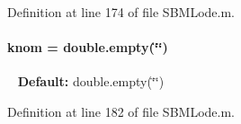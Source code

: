 Definition at line 174 of file S\+B\+M\+Lode.\+m.

\hypertarget{class_s_b_m_lode_a744d356a79732f2b65d02f220c580dd4}{}
\paragraph[{knom}]{\setlength{\rightskip}{0pt plus 5cm}knom = double.\+empty(\char`\"{}\char`\"{})}\label{class_s_b_m_lode_a744d356a79732f2b65d02f220c580dd4}
~\newline
{\bfseries Default\+:} double.\+empty(\char`\"{}\char`\"{}) 

Definition at line 182 of file S\+B\+M\+Lode.\+m.

